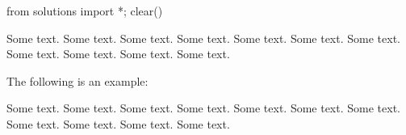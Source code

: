 \begin{python0}
from solutions import *; clear()
\end{python0}

Some text.
Some text.
Some text.
Some text.
Some text.
Some text.
Some text.
Some text.
Some text.
Some text.
Some text.

The following is an example:



Some text.
Some text.
Some text.
Some text.
Some text.
Some text.
Some text.
Some text.
Some text.
Some text.
Some text.

